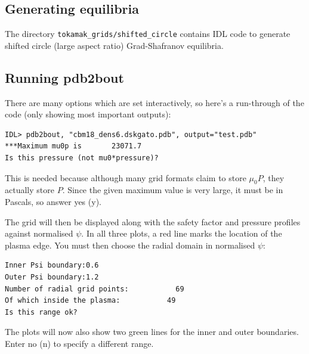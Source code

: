 \documentclass[12pt]{article}
\begin{document}
\subsection{Generating equilibria}

The directory \texttt{tokamak\_grids/shifted\_circle} contains IDL code to generate shifted circle
(large aspect ratio) Grad-Shafranov equilibria.

\subsection{Running pdb2bout}

There are many options which are set interactively, so here's a run-through of the code (only showing most important outputs):

\begin{verbatim}
IDL> pdb2bout, "cbm18_dens6.dskgato.pdb", output="test.pdb"
***Maximum mu0p is       23071.7
Is this pressure (not mu0*pressure)?
\end{verbatim}
This is needed because although many grid formats claim to store $\mu_0 P$, they actually store $P$. Since the given maximum value is very large, it must be in Pascals, so answer yes (y).

The grid will then be displayed along with the safety factor and pressure
profiles against normalised $\psi$. In all three plots, a red line marks the
location of the plasma edge. You must then choose the radial domain in normalised $\psi$:
\begin{verbatim}
Inner Psi boundary:0.6
Outer Psi boundary:1.2
Number of radial grid points:           69
Of which inside the plasma:           49
Is this range ok?
\end{verbatim}
The plots will now also show two green lines for the inner and outer boundaries. Enter no (n) to specify a different range.
\end{document}
